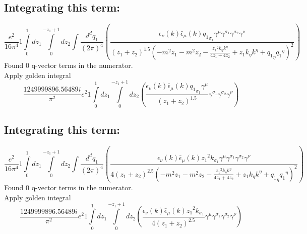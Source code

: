 \subsection*{Integrating this term:}
\begin{dmath}\frac{e^{2}}{16 \pi^{4}}1\int\limits_{ 0 }^{ 1 } d{ z_{ 1 } }\int\limits_{ 0 }^{ - { z_{ 1 } } + 1 } d{ z_{ 2 } }\int\frac{d^d q_1 }{ (2\pi)^4 }\left(\frac{\epsilon_{ \nu }({ k }) \bar{\epsilon}_{ \mu }({ k }) { { q_1 }_{ \sigma_1 } } { \gamma^{ \mu } } { \gamma^{ \sigma_1 } } { \gamma^{ \sigma_2 } } { \gamma^{ \nu } }}{\left({ z_{ 1 } } + { z_{ 2 } }\right)^{1.5} \left(- m^{2} { z_{ 1 } } - m^{2} { z_{ 2 } } - \frac{{ z_{ 1 } }^{2} { { k }_{ \eta } } { { k }^{ \eta } }}{4 { z_{ 1 } } + 4 { z_{ 2 } }} + { z_{ 1 } } { { k }_{ \eta } } { { k }^{ \eta } } + { { q_1 }_{ \eta } } { { q_1 }^{ \eta } }\right)^{2}}\right)\end{dmath}
Found 0 q-vector terms in the numerator.\\
Apply golden integral
\begin{dmath}\frac{1249999896.56489 i}{\pi^{2}} e^{2}1\int\limits_{ 0 }^{ 1 } d{ z_{ 1 } }\int\limits_{ 0 }^{ - { z_{ 1 } } + 1 } d{ z_{ 2 } }\left(\frac{\epsilon_{ \nu }({ k }) \bar{\epsilon}_{ \mu }({ k }) { { q_1 }_{ \sigma_1 } } { \gamma^{ \mu } }}{\left({ z_{ 1 } } + { z_{ 2 } }\right)^{1.5}} { \gamma^{ \sigma_1 } } { \gamma^{ \sigma_2 } } { \gamma^{ \nu } }\right)\end{dmath}
\subsection*{Integrating this term:}
\begin{dmath}\frac{e^{2}}{16 \pi^{4}}1\int\limits_{ 0 }^{ 1 } d{ z_{ 1 } }\int\limits_{ 0 }^{ - { z_{ 1 } } + 1 } d{ z_{ 2 } }\int\frac{d^d q_1 }{ (2\pi)^4 }\left(\frac{\epsilon_{ \nu }({ k }) \bar{\epsilon}_{ \mu }({ k }) { z_{ 1 } }^{2} { { k }_{ \sigma_1 } } { \gamma^{ \mu } } { \gamma^{ \sigma_1 } } { \gamma^{ \sigma_2 } } { \gamma^{ \nu } }}{4 \left({ z_{ 1 } } + { z_{ 2 } }\right)^{2.5} \left(- m^{2} { z_{ 1 } } - m^{2} { z_{ 2 } } - \frac{{ z_{ 1 } }^{2} { { k }_{ \eta } } { { k }^{ \eta } }}{4 { z_{ 1 } } + 4 { z_{ 2 } }} + { z_{ 1 } } { { k }_{ \eta } } { { k }^{ \eta } } + { { q_1 }_{ \eta } } { { q_1 }^{ \eta } }\right)^{2}}\right)\end{dmath}
Found 0 q-vector terms in the numerator.\\
Apply golden integral
\begin{dmath}\frac{1249999896.56489 i}{\pi^{2}} e^{2}1\int\limits_{ 0 }^{ 1 } d{ z_{ 1 } }\int\limits_{ 0 }^{ - { z_{ 1 } } + 1 } d{ z_{ 2 } }\left(\frac{\epsilon_{ \nu }({ k }) \bar{\epsilon}_{ \mu }({ k }) { z_{ 1 } }^{2} { { k }_{ \sigma_1 } }}{4 \left({ z_{ 1 } } + { z_{ 2 } }\right)^{2.5}} { \gamma^{ \mu } } { \gamma^{ \sigma_1 } } { \gamma^{ \sigma_2 } } { \gamma^{ \nu } }\right)\end{dmath}
